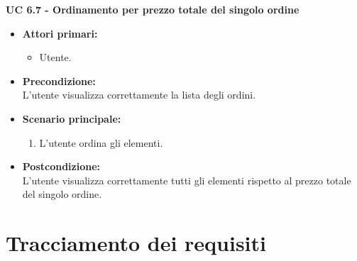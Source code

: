 \vspace{0.5cm}

\noindent \textbf{\large UC 6.7 - Ordinamento per prezzo totale del singolo ordine}
\label{uc:ordinamento-prezzo-totale-ord}
\begin{itemize}

	\item \textbf{Attori primari: }
		\begin{itemize}
			\item Utente.
		\end{itemize}

	\item \textbf{Precondizione: }\\[0.3cm]
		L'utente visualizza correttamente la lista degli ordini.

	\item \textbf{Scenario principale: }
		\begin{enumerate}
			\item L'utente ordina gli elementi.
		\end{enumerate}
		

	\item \textbf{Postcondizione: }\\[0.3cm]
		L'utente visualizza correttamente tutti gli elementi rispetto al prezzo totale del singolo ordine.

\end{itemize}

\vspace{0.5cm}

\section{Tracciamento dei requisiti}

